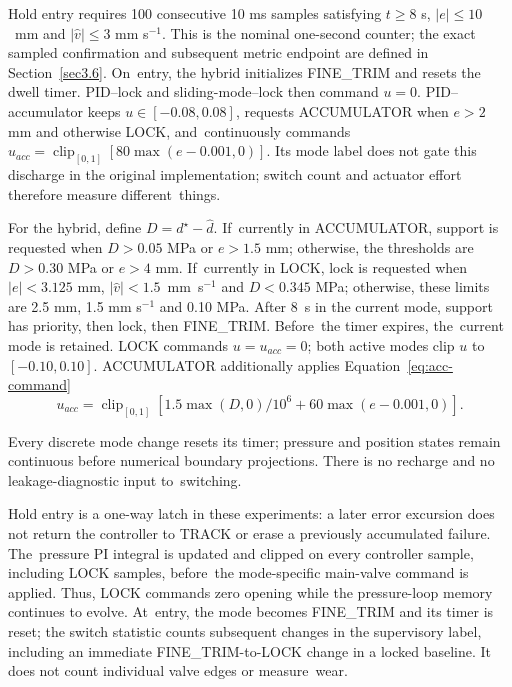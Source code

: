 \documentclass[machines,article,submit,pdftex,moreauthors]{Definitions/mdpi}
\begin{document}
Hold entry requires 100 consecutive 10 ms samples satisfying $t\ge8$ s, \mbox{$|e|\le10$ mm} and $|\hat v|\le3$ mm s$^{-1}$. This is the nominal one-second counter; the exact sampled confirmation and subsequent metric endpoint are defined in Section~\ref{sec3.6}. On~entry, the hybrid initializes FINE\_TRIM and resets the dwell timer. PID--lock and sliding-mode--lock then command $u=0$. PID--accumulator keeps $u\in[-0.08,0.08]$, requests ACCUMULATOR when \mbox{$e>2$} mm and otherwise LOCK, and~continuously commands $u_{acc}=\operatorname{clip}_{[0,1]}[80\max(e-0.001,0)]$. Its mode label does not gate this discharge in the original implementation; switch count and actuator effort therefore measure different~things.

For the hybrid, define $D=d^\star-\hat d$. If~currently in ACCUMULATOR, support is requested when $D>0.05$ MPa or $e>1.5$ mm; otherwise, the thresholds are $D>0.30$ MPa or $e>4$ mm. If~currently in LOCK, lock is requested when $|e|<3.125$ mm, \mbox{$|\hat v|<1.5$ mm s$^{-1}$} and $D<0.345$ MPa; otherwise, these limits are 2.5 mm, 1.5 mm s$^{-1}$ and 0.10 MPa. After \mbox{8 s} in the current mode, support has priority, then lock, then FINE\_TRIM. Before~the timer expires, the~current mode is retained. LOCK commands $u=u_{acc}=0$; both active modes clip $u$ to $[-0.10,0.10]$. ACCUMULATOR additionally applies Equation~\eqref{eq:acc-command}
\begin{equation}
u_{acc}=\operatorname{clip}_{[0,1]}[1.5\max(D,0)/10^6+60\max(e-0.001,0)].
\label{eq:acc-command}
\end{equation}

Every discrete mode change resets its timer; pressure and position states remain continuous before numerical boundary projections. There is no recharge and no leakage-diagnostic input to~switching.

Hold entry is a one-way latch in these experiments: a later error excursion does not return the controller to TRACK or erase a previously accumulated failure. The~pressure PI integral is updated and clipped on every controller sample, including LOCK samples, before~the mode-specific main-valve command is applied. Thus, LOCK commands zero opening while the pressure-loop memory continues to evolve. At~entry, the mode becomes FINE\_TRIM and its timer is reset; the switch statistic counts subsequent changes in the supervisory label, including an immediate FINE\_TRIM-to-LOCK change in a locked baseline. It does not count individual valve edges or measure~wear.
\end{document}
